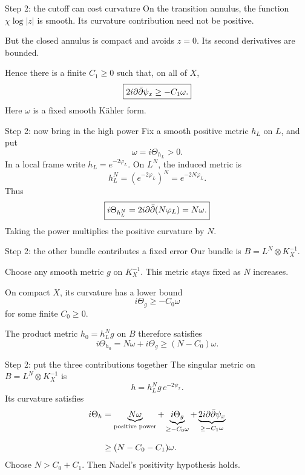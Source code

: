 \begin{frame}{Step 2: the cutoff can cost curvature}
On the transition annulus, the function \(\chi\log|z|\) is smooth.
Its curvature contribution need not be positive.
\par\bigskip
But the closed annulus is compact and avoids \(z=0\). Its second derivatives are bounded.
\par\bigskip
Hence there is a finite \(C_1\ge0\) such that, on all of \(X\),
\[
\boxed{2i\partial\bar\partial\psi_x\ge-C_1\omega.}
\]
Here \(\omega\) is a fixed smooth Kähler form.
\end{frame}

\begin{frame}{Step 2: now bring in the high power}
Fix a smooth positive metric \(h_L\) on \(L\), and put
\[
\omega=i\Theta_{h_L}>0.
\]
In a local frame write \(h_L=e^{-2\varphi_L}\). On \(L^N\), the induced metric is
\[
h_L^N=(e^{-2\varphi_L})^N=e^{-2N\varphi_L}.
\]
Thus
\[
\boxed{i\Theta_{h_L^N}=2i\partial\bar\partial(N\varphi_L)=N\omega.}
\]
Taking the power multiplies the positive curvature by \(N\).
\end{frame}

\begin{frame}{Step 2: the other bundle contributes a fixed error}
Our bundle is \(B=L^N\otimes K_X^{-1}\).
\par\medskip
Choose any smooth metric \(g\) on \(K_X^{-1}\). This metric stays fixed as \(N\) increases.
\par\medskip
On compact \(X\), its curvature has a lower bound
\[
i\Theta_g\ge-C_0\omega
\]
for some finite \(C_0\ge0\).
\par\medskip
The product metric \(h_0=h_L^N g\) on \(B\) therefore satisfies
\[
i\Theta_{h_0}=N\omega+i\Theta_g\ge(N-C_0)\omega.
\]
\end{frame}

\begin{frame}{Step 2: put the three contributions together}
The singular metric on \(B=L^N\otimes K_X^{-1}\) is
\[
h=h_L^N g\,e^{-2\psi_x}.
\]
Its curvature satisfies
\[
\begin{aligned}
i\Theta_h
&=\underbrace{N\omega}_{\text{positive power}}
 +\underbrace{i\Theta_g}_{\ge-C_0\omega}
 +\underbrace{2i\partial\bar\partial\psi_x}_{\ge-C_1\omega}\\[8pt]
&\ge(N-C_0-C_1)\omega.
\end{aligned}
\]
Choose \(N>C_0+C_1\). Then Nadel's positivity hypothesis holds.
\end{frame}

